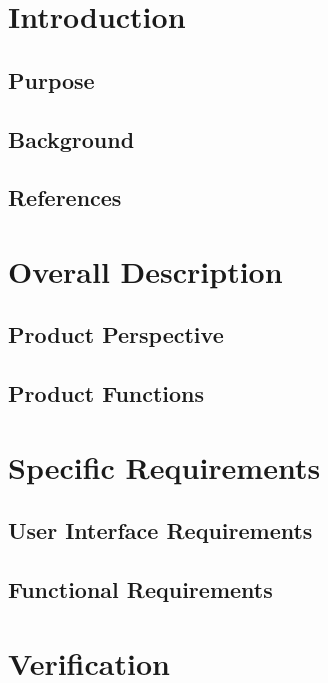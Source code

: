 \documentclass[10pt,draftclsnofoot,onecolumn]{IEEEtran}
\begin{document}
\title{}
\author{Alison Jones \& Parker Okonek}
\maketitle
\begin{abstract}
\end{abstract}
\newpage
\section{Introduction}
\subsection{Purpose}
\subsection{Background}
\subsection{References}
\section{Overall Description}
\subsection{Product Perspective}
\subsection{Product Functions}
\section{Specific Requirements}
\subsection{User Interface Requirements}
\subsection{Functional Requirements}

\section{Verification}
\end{document}
